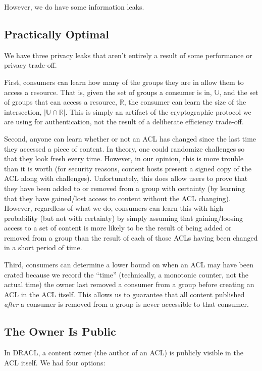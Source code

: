 \documentclass[pdftex,12pt,a4papaer]{report}
\begin{document}
\begin{compactenum}
However, we do have some information leaks.

\subsection{Practically Optimal}

We have three privacy leaks that aren't entirely a result of some performance or
privacy trade-off.

First, consumers can learn how many of the groups they are in allow them to
access a resource. That is, given the set of groups a consumer is in,
$\mathbb{U}$, and the set of groups that can access a resource, $\mathbb{R}$,
the consumer can learn the size of the intersection, $|\mathbb{U} \cap
\mathbb{R}|$. This is simply an artifact of the cryptographic protocol we are
using for authentication, not the result of a deliberate efficiency trade-off.

Second, anyone can learn whether or not an ACL has changed since the last time
they accessed a piece of content. In theory, one could randomize challenges so
that they look fresh every time. However, in our opinion, this is more trouble
than it is worth (for security reasons, content hosts present a signed copy of
the ACL along with challenges). Unfortunately, this does allow users to prove
that they have been added to or removed from a group with certainty (by learning
that they have gained/lost access to content without the ACL changing). However,
regardless of what we do, consumers can learn this with high probability (but
not with certainty) by simply assuming that gaining/loosing access to a set of
content is more likely to be the result of being added or removed from a group
than the result of each of those ACLs having been changed in a short period of
time.

Third, consumers can determine a lower bound on when an ACL may have been crated
because we record the ``time'' (technically, a monotonic counter, not the actual
time) the owner last removed a consumer from a group before creating an ACL in
the ACL itself. This allows us to guarantee that all content published
\emph{after} a consumer is removed from a group is never accessible to that
consumer.


\subsection{The Owner Is Public}

In DRACL, a content owner (the author of an ACL) is publicly visible in the ACL
itself. We had four options:


\end{compactenum}
\end{document}

